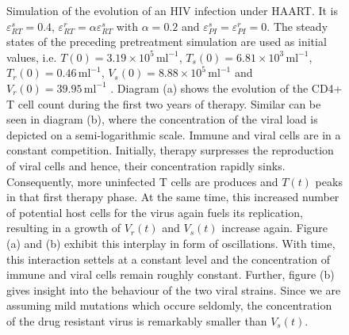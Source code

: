 \begin{figure}
    \caption[]{Simulation of the evolution of an HIV infection under HAART.
    It is $\varepsilon_{RT}^s = 0.4$, $\varepsilon_{RT}^r = \alpha \varepsilon_{RT}^s$ with $\alpha = 0.2$ and 
    $\varepsilon_{PI}^s = \varepsilon_{PI}^r = 0$.
    The steady states of the preceding pretreatment simulation are used as initial values, i.e. $T(0) = 3.19 \times 10^{5} \, \text{ml}^{-1}$, 
    $T_s(0) = 6.81 \times 10^{3} \, \text{ml}^{-1}$, $T_r(0) = 0.46 \, \text{ml}^{-1}$, $V_s(0) = 8.88 \times 10^{5} \, \text{ml}^{-1}$ 
    and $V_r(0) = 39.95 \, \text{ml}^{-1}$ \cite{perelson1993dynamics}.
    Diagram (a) shows the evolution of the CD4+ T cell count during the first two years of therapy.
    Similar can be seen in diagram (b), where the concentration of the viral load is depicted on a semi-logarithmic scale.
    Immune and viral cells are in a constant competition.
    Initially, therapy surpresses the reproduction of viral cells and hence, their concentration rapidly sinks.
    Consequently, more uninfected T cells are produces and $T(t)$ peaks in that first therapy phase.
    At the same time, this increased number of potential host cells for the virus again fuels its replication, resulting in a growth of $V_r(t)$ and $V_s(t)$ increase again.
    Figure (a) and (b) exhibit this interplay in form of oscillations. 
    With time, this interaction settels at a constant level and the concentration of immune and viral cells remain roughly constant.
    Further, figure (b) gives insight into the behaviour of the two viral strains. Since we are assuming mild mutations which occure seldomly, the concentration of the drug resistant virus is remarkably smaller than $V_s(t)$.}
    \label{fig2:treated_eRT_04_alpha_02}
\end{figure}

